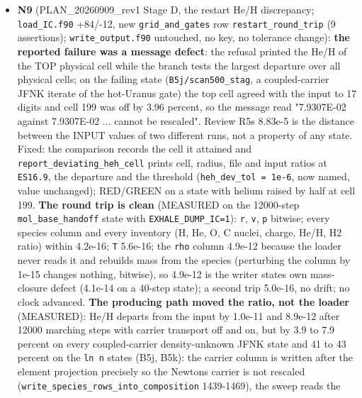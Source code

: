 \documentclass[english,a4paper]{my_memo}
\begin{document}
\begin{itemize}
  spellings in comments. Reported, not fixed: a stale scalar formed in a
  \texttt{k\ ==\ 1} block and read later is a class worth a sweep of the file;
  \texttt{post\_process\_adv.f90} is named by both N11 and N12 (one owner at a
  time; N11 waits for decision 16).
\item
  \textbf{N9} (PLAN\_20260909\_rev1 Stage D, the restart He/H discrepancy;
  \texttt{load\_IC.f90} +84/-12, new \texttt{grid\_and\_gates} row \texttt{restart\_round\_trip}
  (9 assertions); \texttt{write\_output.f90} untouched, no key, no tolerance
  change): \textbf{the reported failure was a message defect}: the refusal
  printed the He/H of the TOP physical cell while the branch tests the
  largest departure over all physical cells; on the failing state
  (\texttt{B5j/scan500\_stag}, a coupled-carrier JFNK iterate of the hot-Uranus
  gate) the top cell agreed with the input to 17 digits and cell 199 was
  off by 3.96 percent, so the message read "7.9307E-02 against
  7.9307E-02 ... cannot be rescaled". Review R5\textquotesingle s 8.83e-5 is the distance
  between the INPUT values of two different runs, not a property of any
  state. Fixed: the comparison records the cell it attained and
  \texttt{report\_deviating\_heh\_cell} prints cell, radius, file and input ratios
  at \texttt{ES16.9}, the departure and the threshold (\texttt{heh\_dev\_tol\ =\ 1e-6}, now
  named, value unchanged); RED/GREEN on a state with helium raised by half
  at cell 199. \textbf{The round trip is clean} (MEASURED on the 12000-step
  \texttt{mol\_base\_handoff} state with \texttt{EXHALE\_DUMP\_IC=1}): \texttt{r}, \texttt{v}, \texttt{p}
  bitwise; every species column and every inventory (H, He, O, C nuclei,
  charge, He/H, H2 ratio) within 4.2e-16; \texttt{T} 5.6e-16; the \texttt{rho} column
  4.9e-12 because the loader never reads it and rebuilds mass from the
  species (perturbing the column by 1e-15 changes nothing, bitwise), so
  4.9e-12 is the writer state\textquotesingle s own mass-closure defect (4.1e-14 on a
  40-step state); a second trip 5.0e-16, no drift; no clock advanced.
  \textbf{The producing path moved the ratio, not the loader} (MEASURED): He/H
  departs from the input by 1.0e-11 and 8.9e-12 after 12000 marching steps
  with carrier transport off and on, but by 3.9 to 7.9 percent on every
  coupled-carrier density-unknown JFNK state and 41 to 43 percent on the
  \texttt{ln\ n} states (B5j, B5k): the carrier column is written after the
  element projection precisely so the Newton\textquotesingle s carrier is not rescaled
  (\texttt{write\_species\_rows\_into\_composition} 1439-1469), the sweep reads the

\end{itemize}
\end{document}
